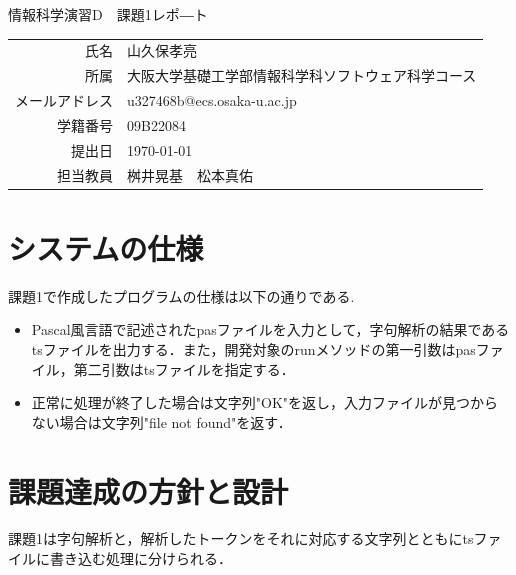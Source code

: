 \documentclass[dvipdfmx]{jarticle}
\begin{document}
\begin{titlepage}
    \begin{center}
        {\huge 情報科学演習D　課題1レポ―ト}
        \vspace{180pt}\\
        \begin{tabular}{rl}
            氏名 & 山久保孝亮\\
            所属 & 大阪大学基礎工学部情報科学科ソフトウェア科学コース\\
            メールアドレス & u327468b@ecs.osaka-u.ac.jp\\
            学籍番号 & 09B22084\\
            提出日 & \today\\
            担当教員 & 桝井晃基　松本真佑
        \end{tabular}
    \end{center}
\end{titlepage}
\section{システムの仕様}
課題1で作成したプログラムの仕様は以下の通りである.
\begin{itemize}
    \item Pascal風言語で記述されたpasファイルを入力として，字句解析の結果であるtsファイルを出力する．また，開発対象のrunメソッドの第一引数はpasファイル，第二引数はtsファイルを指定する．
    \item  正常に処理が終了した場合は文字列"OK"を返し，入力ファイルが見つからない場合は文字列"file not found"を返す．
\end{itemize}
\section{課題達成の方針と設計}
課題1は字句解析と，解析したトークンをそれに対応する文字列とともにtsファイルに書き込む処理に分けられる．
\end{document}
